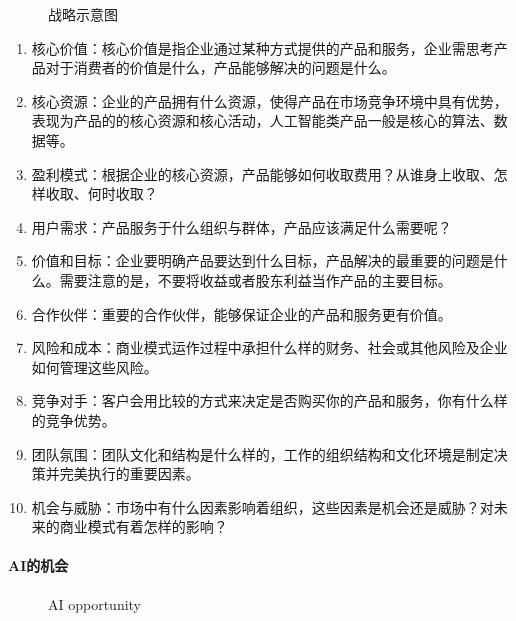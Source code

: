 \documentclass[letterpaper,10pt,english]{sphinxmanual}
\begin{document}
\begin{figure}[H]
\centering
\capstart

\noindent{}
\caption{战略示意图}\label{\detokenize{chapter_introduction/opportunity:id13}}\end{figure}
\begin{enumerate}
%
\item {} 
核心价值：核心价值是指企业通过某种方式提供的产品和服务，企业需思考产品对于消费者的价值是什么，产品能够解决的问题是什么。

\item {} 
核心资源：企业的产品拥有什么资源，使得产品在市场竞争环境中具有优势，表现为产品的的核心资源和核心活动，人工智能类产品一般是核心的算法、数据等。

\item {} 
盈利模式：根据企业的核心资源，产品能够如何收取费用？从谁身上收取、怎样收取、何时收取？

\item {} 
用户需求：产品服务于什么组织与群体，产品应该满足什么需要呢？

\item {} 
价值和目标：企业要明确产品要达到什么目标，产品解决的最重要的问题是什么。需要注意的是，不要将收益或者股东利益当作产品的主要目标。

\item {} 
合作伙伴：重要的合作伙伴，能够保证企业的产品和服务更有价值。

\item {} 
风险和成本：商业模式运作过程中承担什么样的财务、社会或其他风险及企业如何管理这些风险。

\item {} 
竞争对手：客户会用比较的方式来决定是否购买你的产品和服务，你有什么样的竞争优势。

\item {} 
团队氛围：团队文化和结构是什么样的，工作的组织结构和文化环境是制定决策并完美执行的重要因素。

\item {} 
机会与威胁：市场中有什么因素影响着组织，这些因素是机会还是威胁？对未来的商业模式有着怎样的影响？

\end{enumerate}


\paragraph{AI的机会}
\label{\detokenize{chapter_introduction/opportunity:ai}}
\begin{figure}[H]
\centering
\capstart

\noindent{}
\caption{AI opportunity}\label{\detokenize{chapter_introduction/opportunity:id14}}\end{figure}
\end{document}
